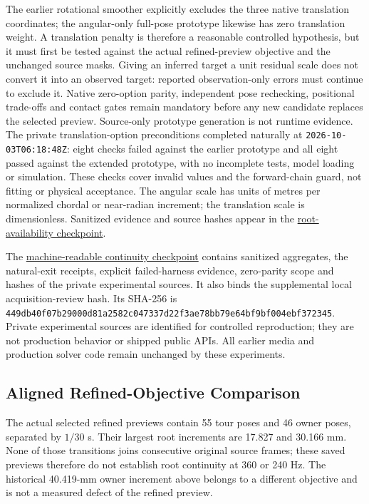 \documentclass[11pt,a4paper]{article}
\begin{document}
The earlier rotational smoother explicitly excludes the three native
translation coordinates; the angular-only full-pose prototype likewise has
zero translation weight. A translation penalty is therefore a reasonable
controlled hypothesis, but it must first be tested against the actual
refined-preview objective and the unchanged source masks. Giving an inferred
target a unit residual scale does not convert it into an observed target:
reported observation-only errors must continue to exclude it. Native
zero-option parity, independent pose rechecking, positional trade-offs and
contact gates remain mandatory before any new candidate replaces the
selected preview. Source-only prototype generation is not runtime evidence.
The private translation-option preconditions completed naturally at
\texttt{2026-10-03T06:18:48Z}: eight checks failed against the earlier
prototype and all eight passed against the extended prototype, with no
incomplete tests, model loading or simulation. These checks cover invalid
values and the forward-chain guard, not fitting or physical acceptance.
The angular scale has units of metres per normalized chordal or near-radian
increment; the translation scale is dimensionless. Sanitized evidence and
source hashes appear in the
\href{root_availability_checkpoint_20261003.json}{root-availability checkpoint}.

The \href{continuity_experiment_checkpoint_20261003.json}{machine-readable
continuity checkpoint} contains sanitized aggregates, the natural-exit
receipts, explicit failed-harness evidence, zero-parity scope and hashes of
the private experimental sources. It also binds the supplemental local
acquisition-review hash. Its SHA-256 is
\nolinkurl{449db40f07b29000d81a2582c047337d22f3ae78bb79e64bf9bf004ebf372345}.
Private experimental sources are identified for controlled reproduction;
they are not production behavior or shipped public APIs. All earlier media
and production solver code remain unchanged by these experiments.

\subsection{Aligned Refined-Objective Comparison}
\label{sec:aligned-refined-continuity}
The actual selected refined previews contain 55 tour poses and 46 owner
poses, separated by $1/30$ s. Their largest root increments are 17.827 and
30.166 mm. None of those transitions joins consecutive original source
frames; these saved previews therefore do not establish root continuity at
360 or 240 Hz. The historical 40.419-mm owner increment above belongs to a
different objective and is not a measured defect of the refined preview.
\end{document}
